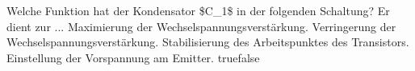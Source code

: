     {Welche Funktion hat der Kondensator \$C\_1\$ in der folgenden Schaltung? Er dient zur ...}
    {Maximierung der Wechselspannungsverstärkung.}
    {Verringerung der Wechselspannungsverstärkung.}
    {Stabilisierung des Arbeitspunktes des Transistors.}
    {Einstellung der Vorspannung am Emitter.}
    {true}{false}
